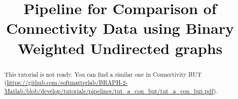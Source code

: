 \documentclass[justified]{tufte-handout}
\title{Pipeline for Comparison of Connectivity Data using Binary Weighted Undirected graphs}
\begin{document}
\maketitle

\begin{abstract}
\noindent
This tutorial is not ready. You can find a similar one in Connectivity BUT (\url{https://github.com/softmatterlab/BRAPH-2-Matlab/blob/develop/tutorials/pipelines/tut_a_con_but/tut_a_con_but.pdf}).
\end{abstract}
\end{document}
